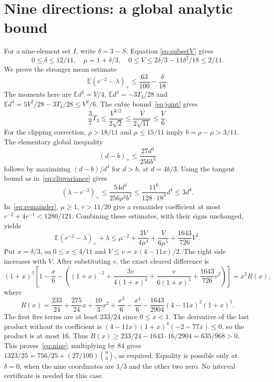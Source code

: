 \documentclass[11pt]{article}
\newcommand{\EE}{\mathbb E}
\newcommand{\pos}[1]{(#1)_+}
\begin{document}
\section{Nine directions: a global analytic bound}
For a nine-element set $I$, write $\delta=3-S$. Equation
\eqref{eq:subsetV} gives
\[
 0\le\delta\le12/11,\quad \mu=1+\delta/3,\quad
 0\le V\le2\delta/3-11\delta^2/18\le2/11.
\]
We prove the stronger mean estimate
\begin{equation}\label{eq:nine}
 \EE\pos{r^{-2}-\lambda}\le\frac{63}{100}-\frac\delta{18}.
\end{equation}
The moments here are
$\EE d^2=V/4$, $\EE d^3=-3T_3/28$ and
$\EE d^4=5V^2/28-3T_4/28\le V^2/6$.
The cubic bound~\eqref{eq:joint} gives
\[
 \frac37T_3\le\frac{V^{3/2}}{2\sqrt2}
 \le\frac{V}{2\sqrt{11}}\le\frac V6.
\]
For the clipping correction, $\rho>18/11$ and $\mu\le15/11$
imply $b=\rho-\mu>3/11$. The elementary global inequality
\[
 (d-b)_+\le\frac{27d^4}{256b^3}
\]
follows by maximizing $(d-b)/d^4$ for $d>b$, at $d=4b/3$.
Using the tangent bound as in~\eqref{eq:clipvariance} gives
\[
 \pos{\lambda-r^{-2}}
 \le\frac{54d^4}{256\rho^3b^3}
 \le\frac{11^6}{128\cdot18^3}d^4\le3d^4.
\]
In~\eqref{eq:remainder}, $\mu\ge1$, $r>11/20$ give a remainder
coefficient at most $r^{-2}+4r^{-1}<1280/121$.
Combining these estimates, with their signs unchanged, yields
\begin{equation}\label{eq:nineenv}
 \EE\pos{r^{-2}-\lambda}+\lambda
 \le\mu^{-2}+\frac{3V}{4\mu^4}+\frac{V}{6\mu^5}
       +\frac{1643}{726}V^2.
\end{equation}
Put $x=\delta/3$, so $0\le x\le4/11$ and
$V\le v=x(4-11x)/2$. The right side increases with $V$.
After substituting $v$, the exact cleared difference is
\[
 (1+x)^5\left[1-\frac{x}{6}
 -\left((1+x)^{-2}+\frac{3v}{4(1+x)^4}
 +\frac{v}{6(1+x)^5}+\frac{1643}{726}v^2\right)\right]=x^2R(x),
\]
where
\[
 R(x)=\frac{233}{24}+\frac{275}{24}x+\frac{10}3x^2
 +\frac{x^3}6-\frac{x^4}6
 -\frac{1643}{2904}(4-11x)^2(1+x)^5.
\]
The first five terms are at least $233/24$ since $0\le x<1$.
The derivative of the last product without its coefficient is
$(4-11x)(1+x)^4(-2-77x)\le0$, so the product is at most 16.
Thus $R(x)\ge233/24-1643\cdot16/2904=635/968>0$.
This proves~\eqref{eq:nine}; multiplying by 84 gives
$1323/25=756/25+(27/100)\binom93$, as required.
Equality is possible only at $\delta=0$, when the nine coordinates
are $1/3$ and the other two zero. No interval certificate is needed
for this case.
\end{document}
